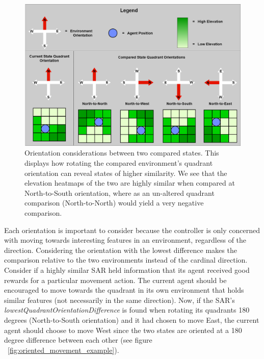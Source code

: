 \begin{figure}[H]
  \includegraphics[width=1.0\columnwidth]{Figures/quadrant_orientations.png}
  \caption{Orientation considerations between two compared states. This displays how rotating the compared environment's quadrant orientation can reveal states of higher similarity. We see that the elevation heatmaps of the two are highly similar when compared at North-to-South orientation, where as an un-altered quadrant comparison (North-to-North) would yield a very negative comparison.}
  \label{fig:quadrant_orientations}
\end{figure}

Each orientation is important to consider because the controller is only concerned with moving towards interesting features in an environment, regardless of the direction.
Considering the orientation with the lowest difference makes the comparison relative to the two environments instead of the cardinal direction.
Consider if a highly similar SAR held information that its agent received good rewards for a particular movement action.
The current agent should be encouraged to move towards the quadrant in its own environment that holds similar features (not necessarily in the same direction).
Now, if the SAR's \textit{lowestQuadrantOrientationDifference} is found when rotating its quadrants 180 degrees (North-to-South orientation) and it had chosen to move East, the current agent should choose to move West since the two states are oriented at a 180 degree difference between each other (see figure ~\ref{fig:oriented_movement_example}).


